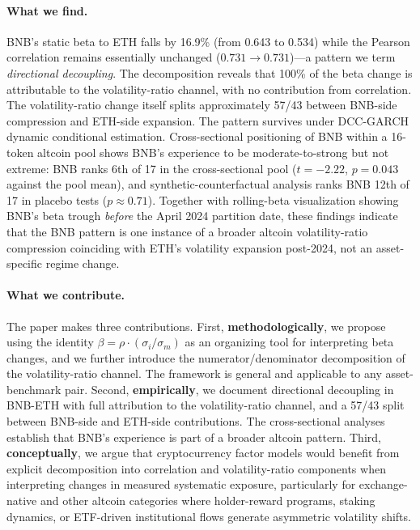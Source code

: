 \documentclass[11pt,a4paper]{article}
\begin{document}
\paragraph{What we find.} BNB's static beta to ETH falls by 16.9\% (from 0.643 to 0.534) while the Pearson correlation remains essentially unchanged ($0.731 \to 0.731$)---a pattern we term \textit{directional decoupling}. The decomposition reveals that 100\% of the beta change is attributable to the volatility-ratio channel, with no contribution from correlation. The volatility-ratio change itself splits approximately 57/43 between BNB-side compression and ETH-side expansion. The pattern survives under DCC-GARCH dynamic conditional estimation. Cross-sectional positioning of BNB within a 16-token altcoin pool shows BNB's experience to be moderate-to-strong but not extreme: BNB ranks 6th of 17 in the cross-sectional pool ($t = -2.22$, $p = 0.043$ against the pool mean), and synthetic-counterfactual analysis ranks BNB 12th of 17 in placebo tests ($p \approx 0.71$). Together with rolling-beta visualization showing BNB's beta trough \emph{before} the April 2024 partition date, these findings indicate that the BNB pattern is one instance of a broader altcoin volatility-ratio compression coinciding with ETH's volatility expansion post-2024, not an asset-specific regime change.

\paragraph{What we contribute.} The paper makes three contributions. First, \textbf{methodologically}, we propose using the identity $\beta = \rho \cdot (\sigma_i/\sigma_m)$ as an organizing tool for interpreting beta changes, and we further introduce the numerator/denominator decomposition of the volatility-ratio channel. The framework is general and applicable to any asset-benchmark pair. Second, \textbf{empirically}, we document directional decoupling in BNB-ETH with full attribution to the volatility-ratio channel, and a 57/43 split between BNB-side and ETH-side contributions. The cross-sectional analyses establish that BNB's experience is part of a broader altcoin pattern. Third, \textbf{conceptually}, we argue that cryptocurrency factor models \citep{liu2021,liu2024} would benefit from explicit decomposition into correlation and volatility-ratio components when interpreting changes in measured systematic exposure, particularly for exchange-native and other altcoin categories where holder-reward programs, staking dynamics, or ETF-driven institutional flows generate asymmetric volatility shifts.
\end{document}
